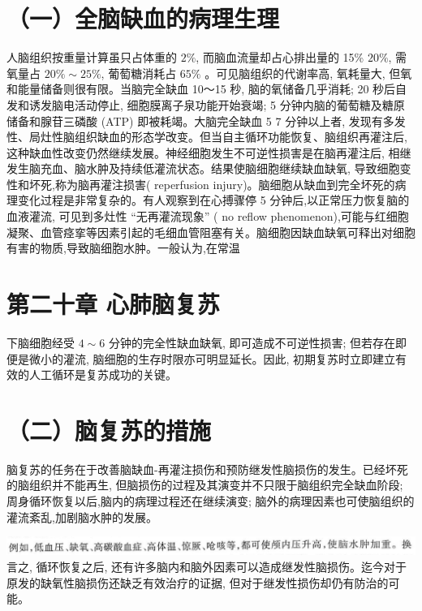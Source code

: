 \documentclass[10pt]{article}
\begin{document}
\section*{（一）全脑缺血的病理生理}
人脑组织按重量计算虽只占体重的 $2 \%$, 而脑血流量却占心排出量的 15\% $20 \%$, 需氧量占 $20 \% \sim 25 \%$, 葡萄糖消耗占 $65 \%$ 。可见脑组织的代谢率高, 氧耗量大, 但氧和能量储备则很有限。当脑完全缺血 10～15 秒, 脑的氧储备几乎消耗; 20 秒后自发和诱发脑电活动停止, 细胞膜离子泉功能开始衰竭; 5 分钟内脑的葡萄糖及糖原储备和腺苷三磷酸 (ATP) 即被耗竭。大脑完全缺血 5 7 分钟以上者, 发现有多发性、局灶性脑组织缺血的形态学改变。但当自主循环功能恢复、脑组织再灌注后, 这种缺血性改变仍然继续发展。神经细胞发生不可逆性损害是在脑再灌注后, 相继发生脑充血、脑水肿及持续低灌流状态。结果使脑细胞继续缺血缺氧, 导致细胞变性和坏死,称为脑再灌注损害( reperfusion injury)。脑细胞从缺血到完全坏死的病理变化过程是非常复杂的。有人观察到在心搏骤停 5 分钟后,以正常压力恢复脑的血液灌流, 可见到多灶性 “无再灌流现象” ( no reflow phenomenon),可能与红细胞凝聚、血管痉挛等因素引起的毛细血管阻塞有关。脑细胞因缺血缺氧可释出对细胞有害的物质,导致脑细胞水肿。一般认为,在常温

\section*{第二十章 心肺脑复苏}
下脑细胞经受 $4 \sim 6$ 分钟的完全性缺血缺氧, 即可造成不可逆性损害; 但若存在即便是微小的灌流, 脑细胞的生存时限亦可明显延长。因此, 初期复苏时立即建立有效的人工循环是复苏成功的关键。

\section*{（二）脑复苏的措施}
脑复苏的任务在于改善脑缺血-再灌注损伤和预防继发性脑损伤的发生。已经坏死的脑组织并不能再生, 但脑损伤的过程及其演变并不只限于脑组织完全缺血阶段; 周身循环恢复以后,脑内的病理过程还在继续演变; 脑外的病理因素也可使脑组织的灌流紊乱,加剧脑水肿的发展。

\includegraphics[max width=\textwidth, center]{2024_07_09_002a177993bd97d1d6d7g-215}\\
言之, 循环恢复之后, 还有许多脑内和脑外因素可以造成继发性脑损伤。迄今对于原发的缺氧性脑损伤还缺乏有效治疗的证据, 但对于继发性损伤却仍有防治的可能。
\end{document}
